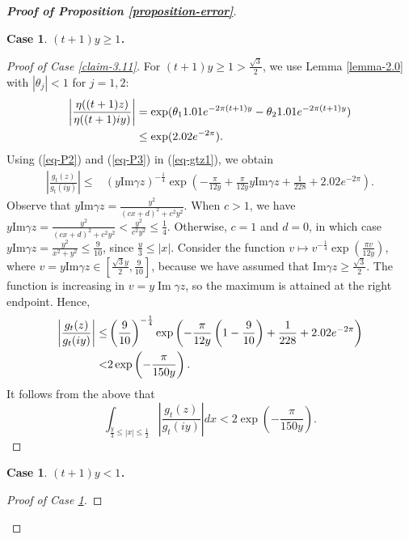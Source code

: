 \documentclass[11pt]{amsart}
\theoremstyle{plain}
\newtheorem{case}[]{Case}
\renewcommand{\Im}{\operatorname{Im}}
\numberwithin{equation}{section}
\begin{document}
\begin{proof}[\textbf{\boldmath Proof of Proposition \ref{proposition-error}}]
\begin{case}
			\textbf{\boldmath $(t+1)y\ge 1$.} 
		\end{case}
		\begin{proof}[Proof of Case \ref{claim-3.11}]
			For $(t+1)y \ge 1>\frac{\sqrt{3}}{2}$, we use Lemma \ref{lemma-2.0} with $|\theta_j|<1$ for $j=1,2$:
			\begin{align}\label{eq-P3}
				\notag
				\left|\frac{\eta((t+1)z)}{\eta((t+1)iy)}\right|&=\exp(\theta_{1}1.01e^{-2\pi (t+1)y}-\theta_{2}1.01e^{-2\pi (t+1)y}) \\
				&\le\exp(2.02e^{-2\pi}).
			\end{align}
			Using (\ref{eq-P2}) and (\ref{eq-P3}) in (\ref{eq-gtz1}), we obtain
			\begin{align*}
				\left|\frac{g_{t}(z)}{g_t(iy)}\right|
				\le & (y\text{Im}\gamma z)^{-\frac{1}{4}}\exp\left(-\frac{\pi}{12y}+\frac{\pi}{12y}y\text{Im}\gamma z+\frac{1}{228}+2.02e^{-2\pi}\right). 
			\end{align*}
			Observe that $y\text{Im}\gamma z=\frac{y^{2}}{(cx+d)^{2}+c^{2}y^{2}}$. 
			When $c>1$, we have $y\text{Im}\gamma z=\frac{y^{2}}{(cx+d)^{2}+c^{2}y^{2}}<\frac{y^{2}}{c^{2}y^{2}}\le \frac{1}{4}$. 
			Otherwise, $c=1$ and $d=0$, in which case $y\text{Im}\gamma z=\frac{y^{2}}{x^{2}+y^{2}}\le \frac{9}{10}$, since $\frac{y}{3}\le |x|$. 
			Consider the function $v \longmapsto v^{-\frac{1}{4}}\exp\left(\frac{\pi v}{12y}\right)$, where $v=y\text{Im}\gamma z\in \left[\frac{\sqrt{3}y}{2}, \frac{9}{10}\right]$, because we have assumed that $\text{Im}\gamma z\ge \frac{\sqrt{3}}{2}$. The function is increasing in $v=y\Im \gamma z$, so the maximum is attained at the right endpoint. Hence,
			\begin{align*}
				\notag
				\left|\frac{g_{t}(z)}{g_t(iy)}\right| \le & \left(\frac{9}{10}\right)^{-\frac{1}{4}}\exp\left(-\frac{\pi}{12y}\left(1-\frac{9}{10}\right)+\frac{1}{228}+2.02e^{-2\pi}\right)\\
				< & 2 \exp\left(-\frac{\pi}{150y}\right).
			\end{align*}
			It follows from the above that
			\begin{equation*}
				\int_{\frac{y}{3}\le |x|\le \frac{1}{2}}  \left|\frac{g_{t}(z)}{g_t(iy)}\right| dx<2\exp\left(-\frac{\pi}{150y}\right).
			\end{equation*} 
		\end{proof}
		\begin{case}\label{claim-3.12}
			\textbf{\boldmath $(t+1)y < 1$.}
		\end{case}
		\begin{proof}[Proof of Case \ref{claim-3.12}]

\end{proof}
\end{proof}
\end{document}
